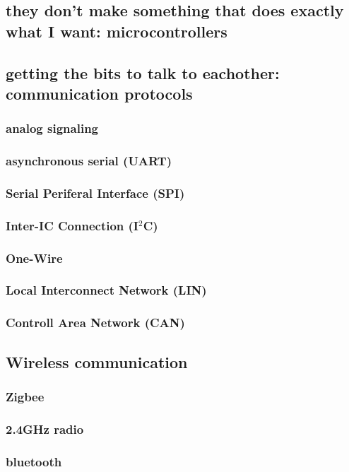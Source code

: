 \documentclass[]{journal}
\begin{document}
	\subsection{they don't make something that does exactly what I want: microcontrollers}
	\subsection{getting the bits to talk to eachother: communication protocols}
		\subsubsection{analog signaling}
		\subsubsection{asynchronous serial (UART)}
		\subsubsection{Serial Periferal Interface (SPI)}
		\subsubsection{Inter-IC Connection (I$^2$C)}
		\subsubsection{One-Wire}
		\subsubsection{Local Interconnect Network (LIN)}
		\subsubsection{Controll Area Network (CAN)}
	\subsection{Wireless communication}
		\subsubsection{Zigbee}
		\subsubsection{2.4GHz radio}
		\subsubsection{bluetooth}
\end{document}
